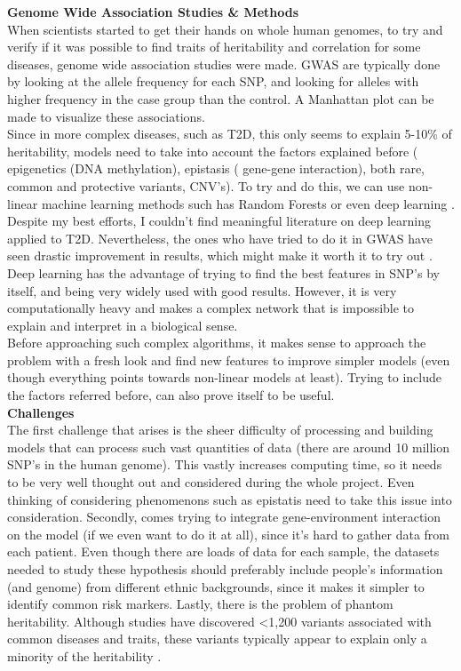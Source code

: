 \documentclass[12pt]{article}
\begin{document}
\textbf{Genome Wide Association Studies \& Methods}
\vspace{0.1in} \\
\indent 
When scientists started to get their hands on whole human genomes, to try and verify if it was possible to find traits of heritability and correlation for some diseases, genome wide association studies were made. GWAS are typically done by looking at the allele frequency for each SNP, and looking for alleles with higher frequency in the case group than the control. A Manhattan plot can be made to visualize these associations.\\
\indent 
Since in more complex diseases, such as T2D, this only seems to explain 5-10\% of heritability, models need to take into account the factors explained before ( epigenetics (DNA methylation), epistasis ( gene-gene interaction), both rare, common and protective variants, CNV's). To try and do this, we can use non-linear machine learning methods such has Random Forests or even deep learning \cite{moore2010bioinformatics}. Despite my best efforts, I couldn't find meaningful literature on deep learning applied to T2D. Nevertheless, the ones who have tried to do it in GWAS have seen drastic improvement in results, which might make it worth it to try out \cite{uppu2016towards}. Deep learning has the advantage of trying to find the best features in SNP's by itself, and being very widely used with good results. However, it is very computationally heavy and makes a complex network that is impossible to explain and interpret in a biological sense.  \\
\indent 
Before approaching such complex algorithms, it makes sense to approach the problem with a fresh look and find new features to improve simpler models (even though everything points towards non-linear models at least). Trying to include the factors referred before, can also prove itself to be useful. \\


\textbf{Challenges}
\vspace{0.1in} \\
\indent 
The first challenge that arises is the sheer difficulty of processing and building models that can process such vast quantities of data (there are around 10 million SNP's in the human genome). This vastly increases computing time, so it needs to be very well thought out and considered during the whole project. Even thinking of considering phenomenons such as epistatis need to take this issue into consideration. Secondly, comes trying to integrate gene-environment interaction on the model (if we even want to do it at all), since it's hard to gather data from each patient. Even though there are loads of data for each sample, the datasets needed to study these hypothesis should preferably include people's information (and genome) from different ethnic backgrounds, since it makes it simpler to identify common risk markers. Lastly, there is the problem of phantom heritability. Although studies have discovered <1,200 variants associated with common diseases and traits, these variants typically appear to explain only a minority of the heritability \cite{zuk2012mystery}.    


{}

 
 
\end{document}
